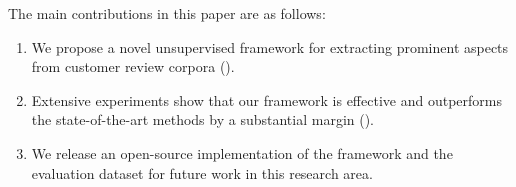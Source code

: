 The main contributions in this paper are as follows:
\begin{enumerate}
    \item We propose a novel unsupervised framework for extracting 
prominent aspects from customer review corpora ().
    \item Extensive experiments show that our framework is effective and 
outperforms the state-of-the-art methods by a substantial margin ().
    \item We release an open-source implementation of the framework 
    and the evaluation dataset for future work in this research area.
\end{enumerate}

%
